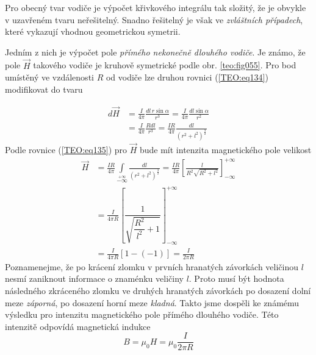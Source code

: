     Pro obecný tvar vodiče je výpočet křivkového integrálu tak složitý, že je obvykle v uzavřeném 
    tvaru neřešitelný. Snadno řešitelný je však ve \emph{zvláštních případech}, které vykazují 
    vhodnou geometrickou symetrii.
    
    Jedním z nich je výpočet pole \emph{přímého nekonečně dlouhého vodiče}. Je známo, že pole
    \(\vec{H}\) takového vodiče je kruhově symetrické podle obr. \ref{teo:fig055}. Pro bod umístěný
    ve vzdálenosti \(R\) od vodiče lze druhou rovnici (\ref{TEO:eq134}) modifikovat do tvaru


    \begin{align*}
      d\vec{H} &= \frac{I}{4\pi}\frac{dl\,r\sin\alpha}{r^3}
                = \frac{I}{4\pi}\frac{dl\sin\alpha}{r^2}                          \\
               &= \frac{I}{4\pi}\frac{Rdl}{r^3}
                = \frac{IR}{4\pi}\frac{dl}{\left(r^2+l^2\right)^{\frac{3}{2}}}
    \end{align*}
    Podle rovnice (\ref{TEO:eq135}) pro \(\vec{H}\) bude mít intenzita magnetického pole 
    velikost 
    \begin{align*}
      \vec{H} &= \frac{IR}{4\pi}\int\limits_{-\infty}\limits^{+\infty}
                 \frac{dl}{\left(r^2+l^2\right)^{\frac{3}{2}}}
               = \frac{IR}{4\pi} 
                 \left[\frac{l}{R^2\sqrt{R^2+l^2}}\right]_{-\infty}^{+\infty}          \\
              &= \frac{I}{4\pi R}
                 \left[\dfrac{1}{\sqrt{\dfrac{R^2}{l^2}+1}}\right]_{-\infty}^{+\infty} \\
              &= \frac{I}{4\pi R}[1-(-1)] = \frac{I}{2\pi R}
    \end{align*}
    Poznamenejme, že po krácení zlomku v prvních hranatých závorkách veličinou \(l\) nesmí zaniknout
    informace o znaménku veličiny \(l\). Proto musí být hodnota následného zkráceného zlomku ve
    druhých hranatých závorkách po dosazení dolní meze \emph{záporná}, po dosazení horní meze
    \emph{kladná}. Takto jsme dospěli ke známému výsledku pro intenzitu magnetického pole přímého
    dlouhého vodiče. Této intenzitě odpovídá magnetická indukce
    \begin{equation*}
      B = \mu_0H = \mu_0\frac{I}{2\pi R}
    \end{equation*}
    

